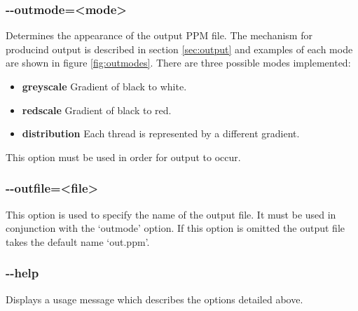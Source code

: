 \subsubsection*{-{}-outmode=\textless mode\textgreater}

Determines the appearance of the output PPM file.
The mechanism for producind output is described in section \ref{sec:output} and
examples of each mode are shown in figure \ref{fig:outmodes}.
There are three possible modes implemented:
\begin{itemize}
\item \textbf{greyscale}
            Gradient of black to white. 
\item \textbf{redscale}
            Gradient of black to red.
\item \textbf{distribution}
            Each thread is represented by a different gradient.
\end{itemize}

This option must be used in order for output to occur.

\subsubsection*{-{}-outfile=\textless file\textgreater}

This option is used to specify the name of the output file.
It must be used in conjunction with the `outmode' option.
If this option is omitted the output file takes the default name `out.ppm'.

\subsubsection*{-{}-help}

Displays a usage message which describes the options detailed above.



